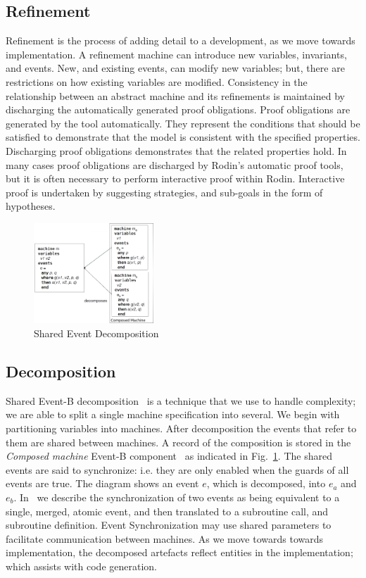 \documentclass{llncs}%
\begin{document}
\subsection{Refinement}
Refinement is the process of adding detail to a development, as we move towards implementation. A refinement machine can introduce new variables, invariants, and events. New, and existing events, can modify new variables; but, there are restrictions on how existing variables are modified. Consistency in the relationship between an abstract machine and its refinements is maintained by discharging the automatically generated proof obligations. Proof obligations are generated by the tool automatically. They represent the conditions that should be satisfied to demonstrate that the model is consistent with the specified properties. Discharging proof obligations demonstrates that the related properties hold. In many cases proof obligations are discharged by Rodin's automatic proof tools, but it is often necessary to perform interactive proof within Rodin. Interactive proof is undertaken by suggesting strategies, and sub-goals in the form of hypotheses. 

\begin{figure}
\centering
\includegraphics[width=0.4\textwidth]{Decomp2.png}
\caption{Shared Event Decomposition}
\label{fig:Decomp2}
\end{figure}

\subsection{Decomposition}\label{decomp}
Shared Event-B decomposition~\cite{Butler09a,decomp2010b} is a technique that we use to handle complexity; we are able to split a single machine specification into several. We begin with partitioning variables into machines. After decomposition the events that refer to them are shared between machines. A record of the composition is stored in the \emph{Composed machine} Event-B component~\cite{decomp2010c} as indicated in Fig.~\ref{fig:Decomp2}.  The shared events are said to synchronize: i.e. they are only enabled when the guards of all events are true.  The diagram shows an event $e$, which is decomposed, into $e_a$ and $e_b$.
%
%
%
In~\cite{ae2011a} we describe the synchronization of two events as being equivalent to a single, merged, atomic event, and then translated to a subroutine call, and subroutine definition. Event Synchronization may use shared parameters to facilitate communication between machines.   As we move towards towards implementation, the decomposed artefacts reflect entities in the implementation; which assists with code generation.
\end{document}
